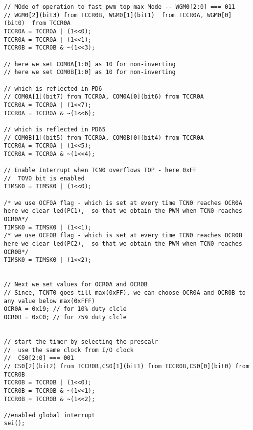 \begin{verbatim}
// MOde of operation to fast_pwm_top_max Mode -- WGM0[2:0] === 011
// WGM0[2](bit3) from TCCR0B, WGM0[1](bit1)  from TCCR0A, WGM0[0](bit0)  from TCCR0A
TCCR0A = TCCR0A | (1<<0);
TCCR0A = TCCR0A | (1<<1);
TCCR0B = TCCR0B & ~(1<<3);	

// here we set COM0A[1:0] as 10 for non-inverting
// here we set COM0B[1:0] as 10 for non-inverting

// which is reflected in PD6
// COM0A[1](bit7) from TCCR0A, COM0A[0](bit6) from TCCR0A
TCCR0A = TCCR0A | (1<<7);
TCCR0A = TCCR0A & ~(1<<6);

// which is reflected in PD65
// COM0B[1](bit5) from TCCR0A, COM0B[0](bit4) from TCCR0A
TCCR0A = TCCR0A | (1<<5);
TCCR0A = TCCR0A & ~(1<<4);

// Enable Interrupt when TCN0 overflows TOP - here 0xFF
//  TOV0 bit is enabled
TIMSK0 = TIMSK0 | (1<<0);

/* we use OCF0A flag - which is set at every time TCN0 reaches OCR0A 
here we clear led(PC1),  so that we obtain the PWM when TCN0 reaches OCR0A*/
TIMSK0 = TIMSK0 | (1<<1);
/* we use OCF0B flag - which is set at every time TCN0 reaches OCR0B 
here we clear led(PC2),  so that we obtain the PWM when TCN0 reaches OCR0B*/
TIMSK0 = TIMSK0 | (1<<2);


// Next we set values for OCR0A and OCR0B
// Since, TCNT0 goes till max(0xFF), we can choose OCR0A and OCR0B to any value below max(0xFFF)
OCR0A = 0x19; // for 10% duty clcle
OCR0B = 0xC0; // for 75% duty clcle


// start the timer by selecting the prescalr
//  use the same clock from I/O clock
//  CS0[2:0] === 001
// CS0[2](bit2) from TCCR0B,CS0[1](bit1) from TCCR0B,CS0[0](bit0) from TCCR0B
TCCR0B = TCCR0B | (1<<0);
TCCR0B = TCCR0B & ~(1<<1);
TCCR0B = TCCR0B & ~(1<<2);

//enabled global interrupt
sei();
\end{verbatim}

